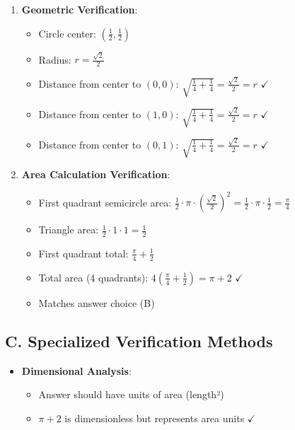 \documentclass[]{article}
\begin{document}
\begin{verificationbox}
\begin{enumerate}[leftmargin=*]
    \item \textbf{Geometric Verification}:
    \begin{itemize}
        \item Circle center: $(\frac{1}{2}, \frac{1}{2})$
        \item Radius: $r = \frac{\sqrt{2}}{2}$
        \item Distance from center to $(0,0)$: $\sqrt{\frac{1}{4} + \frac{1}{4}} = \frac{\sqrt{2}}{2} = r$ $\checkmark$
        \item Distance from center to $(1,0)$: $\sqrt{\frac{1}{4} + \frac{1}{4}} = \frac{\sqrt{2}}{2} = r$ $\checkmark$
        \item Distance from center to $(0,1)$: $\sqrt{\frac{1}{4} + \frac{1}{4}} = \frac{\sqrt{2}}{2} = r$ $\checkmark$
    \end{itemize}
    
    \item \textbf{Area Calculation Verification}:
    \begin{itemize}
        \item First quadrant semicircle area: $\frac{1}{2} \cdot \pi \cdot (\frac{\sqrt{2}}{2})^2 = \frac{1}{2} \cdot \pi \cdot \frac{1}{2} = \frac{\pi}{4}$
        \item Triangle area: $\frac{1}{2} \cdot 1 \cdot 1 = \frac{1}{2}$
        \item First quadrant total: $\frac{\pi}{4} + \frac{1}{2}$
        \item Total area (4 quadrants): $4(\frac{\pi}{4} + \frac{1}{2}) = \pi + 2$ $\checkmark$
        \item Matches answer choice (B)
    \end{itemize}
\end{enumerate}

\subsection*{C. Specialized Verification Methods}
\begin{itemize}[leftmargin=*]
    \item \textbf{Dimensional Analysis}: 
    \begin{itemize}
        \item Answer should have units of area (length²)
        \item $\pi + 2$ is dimensionless but represents area units $\checkmark$
    \end{itemize}
    

\end{itemize}
\end{verificationbox}
\end{document}

